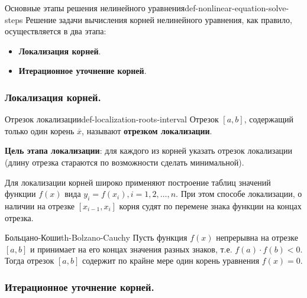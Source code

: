 \documentclass[14pt]{extarticle}
\begin{document}
    \begin{definition}{Основные этапы решения нелинейного уравнения}{def-nonlinear-equation-solve-steps}
        Решение задачи вычисления корней нелинейного уравнения, как правило, осуществляется в два этапа:
        \begin{itemize}
            \item \textbf{Локализация корней}.
            \item \textbf{Итерационное уточнение корней}.
        \end{itemize}
    \end{definition}

    \subsubsection{Локализация корней.}

        \begin{definition}{Отрезок локализации}{def-localization-roots-interval}
            Отрезок $[a, b]$, содержащий только один корень $\overline{x}$, называют \textbf{отрезком локализации}. 
        \end{definition}

        \textbf{Цель этапа локализации}: для каждого из корней указать отрезок локализации (длину отрезка стараются по возможности сделать минимальной).
        
        \vspace{\baselineskip}
        
        Для локализации корней широко применяют построение таблиц значений функции $f(x)$ вида $y_{i} = f(x_{i}), i = 1, 2, \ldots, n$. При этом способе локализации, о наличии на отрезке $[x_{i-1}, x_{i}]$ корня судят по перемене знака функции на концах отрезка.

        \begin{theorem}{Больцано-Коши}{th-Bolzano-Cauchy}
            Пусть функция $f(x)$ непрерывна на отрезке $[a, b]$ и принимает на его концах значения разных знаков, т.е. $f(a) \cdot f(b) < 0$.\\ 
            Тогда отрезок $[a, b]$ содержит по крайне мере один корень уравнения $f(x) = 0$.
        \end{theorem}

    \subsubsection{Итерационное уточнение корней.}
        
\end{document}
